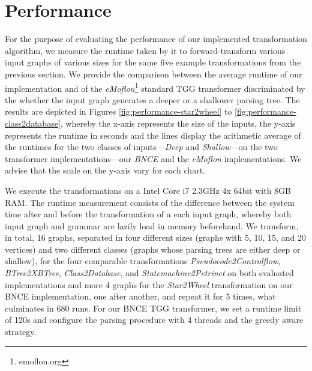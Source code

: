 \section{Performance}
For the purpose of evaluating the performance of our implemented transformation algorithm, we measure the runtime taken by it to forward-transform various input graphs of various sizes for the same five example transformations from the previous section. We provide the comparison between the average runtime of our implementation and of the \emph{eMoflon}\footnote{emoflon.org} standard TGG transformer \cite{leblebici2014developing} discriminated by the whether the input graph generates a deeper or a shallower parsing tree. The results are depicted in Figures \ref{fig:performance-star2wheel} to \ref{fig:performance-class2database}, whereby the x-axis represents the size of the inputs, the y-axis represents the runtime in seconds and the lines display the arithmetic average of the runtimes for the two classes of inputs---\emph{Deep} and \emph{Shallow}---on the two transformer implementations---our \emph{BNCE} and the \emph{eMoflon} implementations. We advise that the scale on the y-axis vary for each chart.

We execute the transformations on a Intel Core i7 2.3GHz 4x 64bit with 8GB RAM. The runtime measurement consists of the difference between the system time after and before the transformation of a each input graph, whereby both input graph and grammar are lazily load in memory beforehand. We transform, in total, 16 graphs, separated in four different sizes (graphs with 5, 10, 15, and 20 vertices) and two different classes (graphs whose parsing trees are either deep or shallow), for the four comparable transformations \emph{Pseudocode2Controlflow}, \emph{BTree2XBTree}, \emph{Class2Database}, and \emph{Statemachine2Petrinet} on both evaluated implementations and more 4 graphs for the \emph{Star2Wheel} transformation on our BNCE implementation, one after another, and repeat it for 5 times, what culminates in 680 runs. For our BNCE TGG transformer, we set a runtime limit of 120s and configure the parsing procedure with 4 threads and the greedy aware strategy.

